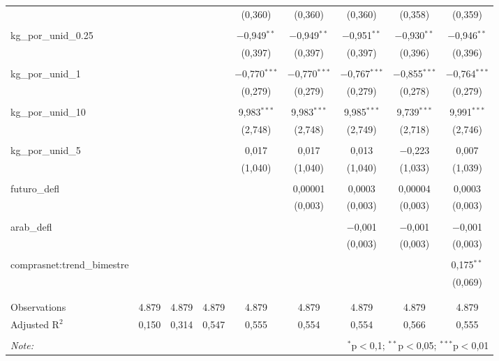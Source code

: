 \begin{table}[!htbp]
\begin{tabular}{@{\extracolsep{5pt}}lcccccccc}
  &  &  &  & (0,360) & (0,360) & (0,360) & (0,358) & (0,359) \\ 
  & & & & & & & & \\ 
 kg\_por\_unid\_0.25 &  &  &  & $-$0,949$^{**}$ & $-$0,949$^{**}$ & $-$0,951$^{**}$ & $-$0,930$^{**}$ & $-$0,946$^{**}$ \\ 
  &  &  &  & (0,397) & (0,397) & (0,397) & (0,396) & (0,396) \\ 
  & & & & & & & & \\ 
 kg\_por\_unid\_1 &  &  &  & $-$0,770$^{***}$ & $-$0,770$^{***}$ & $-$0,767$^{***}$ & $-$0,855$^{***}$ & $-$0,764$^{***}$ \\ 
  &  &  &  & (0,279) & (0,279) & (0,279) & (0,278) & (0,279) \\ 
  & & & & & & & & \\ 
 kg\_por\_unid\_10 &  &  &  & 9,983$^{***}$ & 9,983$^{***}$ & 9,985$^{***}$ & 9,739$^{***}$ & 9,991$^{***}$ \\ 
  &  &  &  & (2,748) & (2,748) & (2,749) & (2,718) & (2,746) \\ 
  & & & & & & & & \\ 
 kg\_por\_unid\_5 &  &  &  & 0,017 & 0,017 & 0,013 & $-$0,223 & 0,007 \\ 
  &  &  &  & (1,040) & (1,040) & (1,040) & (1,033) & (1,039) \\ 
  & & & & & & & & \\ 
 futuro\_defl &  &  &  &  & 0,00001 & 0,0003 & 0,00004 & 0,0003 \\ 
  &  &  &  &  & (0,003) & (0,003) & (0,003) & (0,003) \\ 
  & & & & & & & & \\ 
 arab\_defl &  &  &  &  &  & $-$0,001 & $-$0,001 & $-$0,001 \\ 
  &  &  &  &  &  & (0,003) & (0,003) & (0,003) \\ 
  & & & & & & & & \\ 
 comprasnet:trend\_bimestre &  &  &  &  &  &  &  & 0,175$^{**}$ \\ 
  &  &  &  &  &  &  &  & (0,069) \\ 
  & & & & & & & & \\ 
\hline \\[-1.8ex] 
Observations & 4.879 & 4.879 & 4.879 & 4.879 & 4.879 & 4.879 & 4.879 & 4.879 \\ 
Adjusted R$^{2}$ & 0,150 & 0,314 & 0,547 & 0,555 & 0,554 & 0,554 & 0,566 & 0,555 \\ 
\hline 
\hline \\[-1.8ex] 
\textit{Note:}  & \multicolumn{8}{r}{$^{*}$p$<$0,1; $^{**}$p$<$0,05; $^{***}$p$<$0,01} \\ 
\end{tabular} 
\end{table} 
